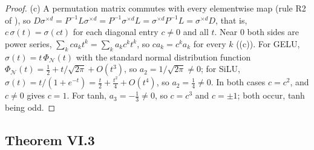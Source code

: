 \begin{proof}
(c) A permutation matrix commutes with every elementwise map (rule R2 of ), so
$D\sigma^{\times d}=P^{-1}L\sigma^{\times d}=P^{-1}\sigma^{\times d}L=\sigma^{\times d}P^{-1}L=\sigma^{\times d}D$, that is,
$c\,\sigma(t)=\sigma(ct)$ for each diagonal entry $c\ne0$ and all $t$. Near $0$ both sides are power series,
$\sum_kca_kt^k=\sum_ka_kc^kt^k$, so $ca_k=c^ka_k$ for every $k$ ((c)). For GELU, $\sigma(t)=t\,\Phi_{\mathcal
N}(t)$ with the standard normal distribution function $\Phi_{\mathcal N}(t)=\tfrac12+t/\sqrt{2\pi}+O(t^3)$, so
$a_2=1/\sqrt{2\pi}\ne0$; for SiLU, $\sigma(t)=t/(1+e^{-t})=\tfrac t2+\tfrac{t^2}4+O(t^4)$, so $a_2=\tfrac14\ne0$. In both cases
$c=c^2$, and $c\ne0$ gives $c=1$. For tanh, $a_3=-\tfrac13\ne0$, so $c=c^3$ and $c=\pm1$; both occur, tanh being odd.
\end{proof}

\subsection{Theorem VI.3}\label{proof:VI.3}

